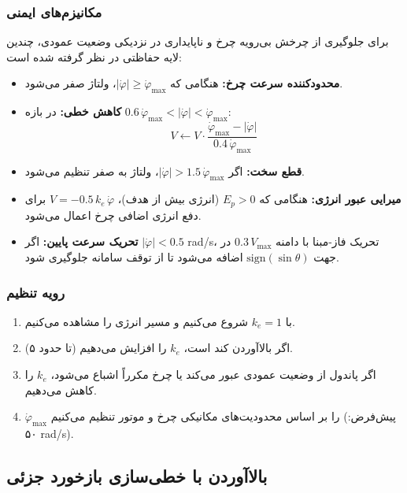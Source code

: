 \subsubsection{مکانیزم‌های ایمنی}

برای جلوگیری از چرخش بی‌رویه چرخ و ناپایداری در نزدیکی وضعیت عمودی، چندین لایه حفاظتی در نظر گرفته شده است:

\begin{itemize}
    \item \textbf{محدودکننده سرعت چرخ:} هنگامی که $|\dot\varphi| \geq \dot\varphi_{\max}$، ولتاژ صفر می‌شود.
    \item \textbf{کاهش خطی:} در بازه $0.6\,\dot\varphi_{\max} < |\dot\varphi| < \dot\varphi_{\max}$:
    \begin{equation}
    V \leftarrow V \cdot \frac{\dot\varphi_{\max} - |\dot\varphi|}{0.4\,\dot\varphi_{\max}}
    \end{equation}
    \item \textbf{قطع سخت:} اگر $|\dot\varphi| > 1.5\,\dot\varphi_{\max}$، ولتاژ به صفر تنظیم می‌شود.
    \item \textbf{میرایی عبور انرژی:} هنگامی که $E_p > 0$ (انرژی بیش از هدف)، $V = -0.5\,k_e\,\dot\varphi$ برای دفع انرژی اضافی چرخ اعمال می‌شود.
    \item \textbf{تحریک سرعت پایین:} اگر $|\dot\varphi| < 0.5$ rad/s، تحریک فاز-مبنا با دامنه $0.3\,V_{\max}$ در جهت $\text{sign}(\sin\theta)$ اضافه می‌شود تا از توقف سامانه جلوگیری شود.
\end{itemize}

\subsubsection{رویه تنظیم}

\begin{enumerate}[label=\arabic*.]
    \item با $k_e = 1$ شروع می‌کنیم و مسیر انرژی را مشاهده می‌کنیم.
    \item اگر بالاآوردن کند است، $k_e$ را افزایش می‌دهیم (تا حدود ۵).
    \item اگر پاندول از وضعیت عمودی عبور می‌کند یا چرخ مکرراً اشباع می‌شود، $k_e$ را کاهش می‌دهیم.
    \item $\dot\varphi_{\max}$ را بر اساس محدودیت‌های مکانیکی چرخ و موتور تنظیم می‌کنیم (پیش‌فرض: ۵۰ rad/s).
\end{enumerate}


\subsection{بالاآوردن با خطی‌سازی بازخورد جزئی}

